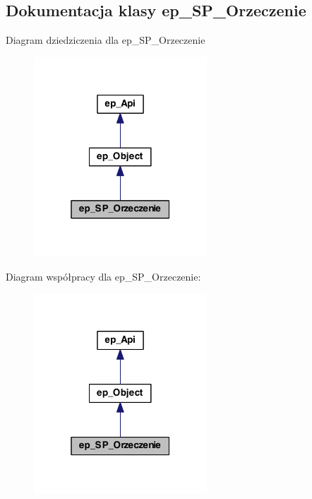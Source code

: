 \hypertarget{classep___s_p___orzeczenie}{\subsection{Dokumentacja klasy ep\-\_\-\-S\-P\-\_\-\-Orzeczenie}
\label{classep___s_p___orzeczenie}
}


Diagram dziedziczenia dla ep\-\_\-\-S\-P\-\_\-\-Orzeczenie\nopagebreak
\begin{figure}[H]
\begin{center}
\leavevmode
\includegraphics[width=184pt]{classep___s_p___orzeczenie__inherit__graph}
\end{center}
\end{figure}


Diagram współpracy dla ep\-\_\-\-S\-P\-\_\-\-Orzeczenie\-:\nopagebreak
\begin{figure}[H]
\begin{center}
\leavevmode
\includegraphics[width=184pt]{classep___s_p___orzeczenie__coll__graph}
\end{center}
\end{figure}
